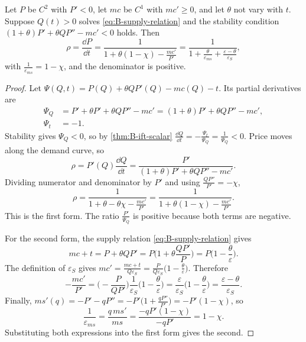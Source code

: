 \begin{proposition}\label{prop:B-passthrough-conduct}
Let $P$ be $C^2$ with $P' < 0$, let $mc$ be $C^1$ with $mc' \geq 0$, and let $\theta$ not vary with $t$. Suppose
$Q(t) > 0$ solves \eqref{eq:B-supply-relation} and the stability condition $(1 + \theta)P' + \theta QP'' - mc' < 0$
holds. Then
\begin{equation}\label{eq:B-pt-conduct}
\rho = \frac{\dd P}{\dd t} = \frac{1}{1 + \theta(1 - \chi) - \frac{mc'}{P'}}
= \frac{1}{1 + \frac{\theta}{\varepsilon_{ms}} + \frac{\varepsilon - \theta}{\varepsilon_S}} ,
\end{equation}
with $\frac{1}{\varepsilon_{ms}} = 1 - \chi$, and the denominator is positive.
\end{proposition}

\begin{proof}
Let $\Psi(Q, t) = P(Q) + \theta QP'(Q) - mc(Q) - t$. Its partial derivatives are
\begin{align*}
\Psi_Q &= P' + \theta P' + \theta QP'' - mc' = (1 + \theta)P' + \theta QP'' - mc' , \\
\Psi_t &= -1 .
\end{align*}
Stability gives $\Psi_Q < 0$, so by \cref{thm:B-ift-scalar} $\frac{\dd Q}{\dd t} = -\frac{\Psi_t}{\Psi_Q} = \frac{1}{\Psi_Q} < 0$.
Price moves along the demand curve, so
\begin{equation*}
\rho = P'(Q)\frac{\dd Q}{\dd t} = \frac{P'}{(1 + \theta)P' + \theta QP'' - mc'} .
\end{equation*}
Dividing numerator and denominator by $P'$ and using $\frac{QP''}{P'} = -\chi$,
\begin{equation*}
\rho = \frac{1}{1 + \theta - \theta\chi - \frac{mc'}{P'}} = \frac{1}{1 + \theta(1 - \chi) - \frac{mc'}{P'}} .
\end{equation*}
This is the first form. The ratio $\frac{P'}{\Psi_Q}$ is positive because both terms are negative.

For the second form, the supply relation \eqref{eq:B-supply-relation} gives
\begin{equation*}
mc + t = P + \theta QP' = P\Big(1 + \theta\frac{QP'}{P}\Big) = P\Big(1 - \frac{\theta}{\varepsilon}\Big) .
\end{equation*}
The definition of $\varepsilon_S$ gives $mc' = \frac{mc + t}{Q\varepsilon_S} = \frac{P}{Q\varepsilon_S}\big(1 - \frac{\theta}{\varepsilon}\big)$.
Therefore
\begin{equation*}
-\frac{mc'}{P'} = \Big(-\frac{P}{QP'}\Big)\frac{1}{\varepsilon_S}\Big(1 - \frac{\theta}{\varepsilon}\Big)
= \frac{\varepsilon}{\varepsilon_S}\Big(1 - \frac{\theta}{\varepsilon}\Big) = \frac{\varepsilon - \theta}{\varepsilon_S} .
\end{equation*}
Finally, $ms'(q) = -P' - qP'' = -P'\big(1 + \frac{qP''}{P'}\big) = -P'(1 - \chi)$, so
\begin{equation*}
\frac{1}{\varepsilon_{ms}} = \frac{q\,ms'}{ms} = \frac{-qP'(1 - \chi)}{-qP'} = 1 - \chi .
\end{equation*}
Substituting both expressions into the first form gives the second.
\end{proof}

